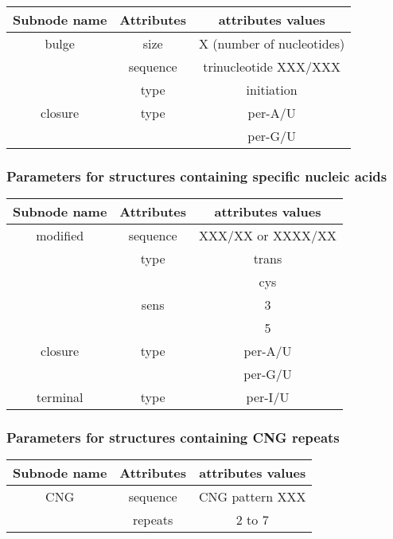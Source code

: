 \documentclass{article}
\begin{document}
\begin{table}[hc]
\begin{tabular}[h]{| c | c | c |}
\textbf{Subnode name} & \textbf{Attributes} & \textbf{attributes values} \\
 \hline
bulge & size & X (number of nucleotides) \\
 & sequence & trinucleotide XXX/XXX \\
 & type & initiation \\
  \hline
closure & type & per-A/U \\
 & & per-G/U \\
  \hline
\end{tabular}
\end{table}

\subsubsection{Parameters for structures containing specific nucleic acids}

\begin{table}[hc]
\begin{tabular}[h]{| c | c | c |}
\textbf{Subnode name} & \textbf{Attributes} & \textbf{attributes values} \\
 \hline
modified & sequence & XXX/XX or XXXX/XX \\
 & type & trans \\
 & & cys \\
 & sens & 3 \\
 & & 5 \\
  \hline
closure & type & per-A/U \\
 & & per-G/U \\
  \hline
terminal & type & per-I/U \\
 \hline
\end{tabular} 
\end{table}

\subsubsection{Parameters for structures containing CNG repeats}

\begin{table}[hc]
\begin{tabular}[h]{| c | c | c |}
\textbf{Subnode name} & \textbf{Attributes} & \textbf{attributes values} \\
 \hline
CNG & sequence & CNG pattern XXX \\
 & repeats & 2 to 7 \\
  \hline
\end{tabular}
\end{table}
\end{document}
